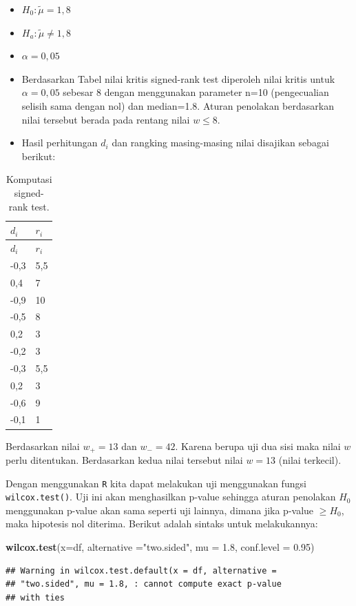 \documentclass[]{book}
\newenvironment{Shaded}{\begin{snugshade}}{\end{snugshade}}
\newcommand{\KeywordTok}[1]{\textcolor[rgb]{0.13,0.29,0.53}{\textbf{#1}}}
\newcommand{\DataTypeTok}[1]{\textcolor[rgb]{0.13,0.29,0.53}{#1}}
\newcommand{\FloatTok}[1]{\textcolor[rgb]{0.00,0.00,0.81}{#1}}
\newcommand{\StringTok}[1]{\textcolor[rgb]{0.31,0.60,0.02}{#1}}
\newcommand{\NormalTok}[1]{#1}
\begin{document}
\begin{itemize}
\item
  \(H_0: \tilde{\mu}=1,8\)
\item
  \(H_a: \tilde{\mu}\ne1,8\)
\item
  \(\alpha=0,05\)
\item
  Berdasarkan Tabel nilai kritis signed-rank test diperoleh nilai kritis
  untuk \(\alpha=0,05\) sebesar 8 dengan menggunakan parameter n=10
  (pengecualian selisih sama dengan nol) dan median=1.8. Aturan
  penolakan berdasarkan nilai tersebut berada pada rentang nilai
  \(w\le8\).
\item
  Hasil perhitungan \(d_i\) dan rangking masing-masing nilai disajikan
  sebagai berikut:
\end{itemize}

\begin{longtable}[]{@{}ll@{}}
\caption{\label{tab:signranktest2} Komputasi signed-rank
test.}\tabularnewline
\toprule
\textbf{\(d_i\)} & \textbf{\(r_i\)}\tabularnewline
\midrule
\endfirsthead
\toprule
\textbf{\(d_i\)} & \textbf{\(r_i\)}\tabularnewline
\midrule
\endhead
-0,3 & 5,5\tabularnewline
0,4 & 7\tabularnewline
-0,9 & 10\tabularnewline
-0,5 & 8\tabularnewline
0,2 & 3\tabularnewline
-0,2 & 3\tabularnewline
-0,3 & 5,5\tabularnewline
0,2 & 3\tabularnewline
-0,6 & 9\tabularnewline
-0,1 & 1\tabularnewline
\bottomrule
\end{longtable}

Berdasarkan nilai \(w_+=13\) dan \(w_-=42\). Karena berupa uji dua sisi
maka nilai \(w\) perlu ditentukan. Berdasarkan kedua nilai tersebut
nilai \(w=13\) (nilai terkecil).

Dengan menggunakan \texttt{R} kita dapat melakukan uji menggunakan
fungsi \texttt{wilcox.test()}. Uji ini akan menghasilkan p-value
sehingga aturan penolakan \(H_0\) menggunakan p-value akan sama seperti
uji lainnya, dimana jika p-value \(\ge H_0\), maka hipotesis nol
diterima. Berikut adalah sintaks untuk melakukannya:

\begin{Shaded}
\begin{Highlighting}[]
\KeywordTok{wilcox.test}\NormalTok{(}\DataTypeTok{x=}\NormalTok{df, }\DataTypeTok{alternative =}\StringTok{"two.sided"}\NormalTok{, }\DataTypeTok{mu =} \FloatTok{1.8}\NormalTok{,}
            \DataTypeTok{conf.level =} \FloatTok{0.95}\NormalTok{)}
\end{Highlighting}
\end{Shaded}

\begin{verbatim}
## Warning in wilcox.test.default(x = df, alternative =
## "two.sided", mu = 1.8, : cannot compute exact p-value
## with ties
\end{verbatim}
\end{document}

